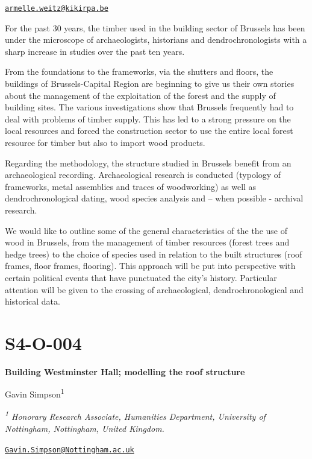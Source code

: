 \documentclass[
]{book}
\begin{document}
\href{mailto:armelle.weitz@kikirpa.be}{\nolinkurl{armelle.weitz@kikirpa.be}}

For the past 30 years, the timber used in the building sector of Brussels has been under the microscope of archaeologists, historians and dendrochronologists with a sharp increase in studies over the past ten years.

From the foundations to the frameworks, via the shutters and floors, the buildings of Brussels-Capital Region are beginning to give us their own stories about the management of the exploitation of the forest and the supply of building sites. The various investigations show that Brussels frequently had to deal with problems of timber supply. This has led to a strong pressure on the local resources and forced the construction sector to use the entire local forest resource for timber but also to import wood products.

Regarding the methodology, the structure studied in Brussels benefit from an archaeological recording. Archaeological research is conducted (typology of frameworks, metal assemblies and traces of woodworking) as well as dendrochronological dating, wood species analysis and -- when possible - archival research.

We would like to outline some of the general characteristics of the the use of wood in Brussels, from the management of timber resources (forest trees and hedge trees) to the choice of species used in relation to the built structures (roof frames, floor frames, flooring). This approach will be put into perspective with certain political events that have punctuated the city's history. Particular attention will be given to the crossing of archaeological, dendrochronological and historical data.

\hypertarget{s4-o-004}{%
\section*{S4-O-004}\label{s4-o-004}}

\textbf{Building Westminster Hall; modelling the roof structure}

Gavin Simpson\textsuperscript{1}

\emph{\textsuperscript{1} Honorary Research Associate, Humanities Department, University of Nottingham, Nottingham, United Kingdom.}

\href{mailto:Gavin.Simpson@Nottingham.ac.uk}{\nolinkurl{Gavin.Simpson@Nottingham.ac.uk}}
\end{document}
